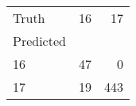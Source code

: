 \begin{tabular}{lrr}
\toprule
Truth & 16 & 17 \\
Predicted &  &  \\
\midrule
16 & 47 & 0 \\
17 & 19 & 443 \\
\bottomrule
\end{tabular}
